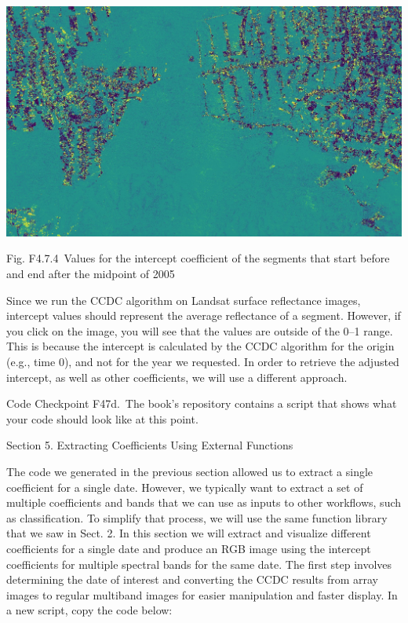 \documentclass[
  letterpaper,
  DIV=11,
  numbers=noendperiod]{scrreprt}
\begin{document}
\includegraphics{./F4/image78.png}

Fig. F4.7.4~Values for the intercept coefficient of the segments that
start before and end after the midpoint of 2005

Since we run the CCDC algorithm on Landsat surface reflectance images,
intercept values should represent the average reflectance of a segment.
However, if you click on the image, you will see that the values are
outside of the 0--1 range. This is because the intercept is calculated
by the CCDC algorithm for the origin (e.g., time 0), and not for the
year we requested. In order to retrieve the adjusted intercept, as well
as other coefficients, we will use a different approach.

\begin{tcolorbox}[enhanced jigsaw, left=2mm, breakable, rightrule=.15mm, opacityback=0, colframe=quarto-callout-note-color-frame, colbacktitle=quarto-callout-note-color!10!white, arc=.35mm, opacitybacktitle=0.6, toptitle=1mm, colback=white, leftrule=.75mm, title=\textcolor{quarto-callout-note-color}{\faInfo}\hspace{0.5em}{Note}, toprule=.15mm, bottomtitle=1mm, titlerule=0mm, bottomrule=.15mm, coltitle=black]

Code Checkpoint F47d.~The book's repository contains a script that shows
what your code should look like at this point.

\end{tcolorbox}

Section 5. Extracting Coefficients Using External Functions

The code we generated in the previous section allowed us to extract a
single coefficient for a single date. However, we typically want to
extract a set of multiple coefficients and bands that we can use as
inputs to other workflows, such as classification. To simplify that
process, we will use the same function library that we saw in Sect. 2.
In this section we will extract and visualize different coefficients for
a single date and produce an RGB image using the intercept coefficients
for multiple spectral bands for the same date. The first step involves
determining the date of interest and converting the CCDC results from
array images to regular multiband images for easier manipulation and
faster display. In a new script, copy the code below:
\end{document}
